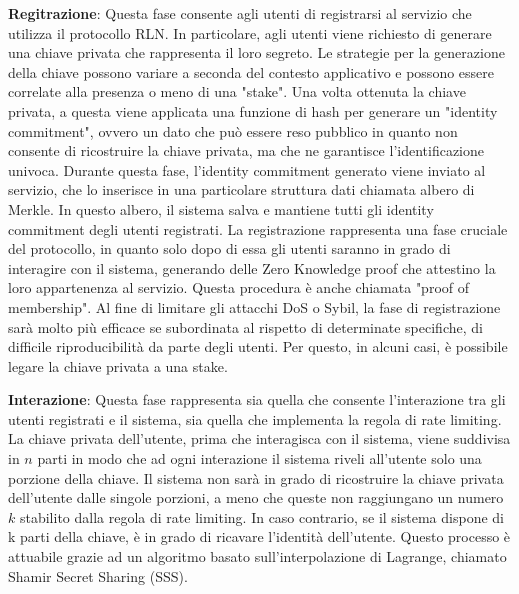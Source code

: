 \textbf{Regitrazione}: Questa fase consente agli utenti di registrarsi al servizio che utilizza il protocollo RLN. In
particolare, agli utenti viene richiesto di generare una chiave privata che rappresenta il loro segreto. Le strategie
per la generazione della chiave possono variare a seconda del contesto applicativo e possono essere correlate alla
presenza o meno di una "stake". Una volta ottenuta la chiave privata, a questa viene applicata una funzione di hash per
generare un "identity commitment", ovvero un dato che può essere reso pubblico in quanto non consente di ricostruire la
chiave privata, ma che ne garantisce l'identificazione univoca. Durante questa fase, l'identity commitment generato
viene inviato al servizio, che lo inserisce in una particolare struttura dati chiamata albero di Merkle. In questo
albero, il sistema salva e mantiene tutti gli identity commitment degli utenti registrati. La registrazione rappresenta
una fase cruciale del protocollo, in quanto solo dopo di essa gli utenti saranno in grado di interagire con il sistema,
generando delle Zero Knowledge proof che attestino la loro appartenenza al servizio. Questa procedura è anche chiamata "proof
of membership". Al fine di limitare gli attacchi DoS o Sybil, la fase di registrazione sarà molto più efficace se
subordinata al rispetto di determinate specifiche, di difficile riproducibilità da parte degli utenti. Per questo, in
alcuni casi, è possibile legare la chiave privata a una stake.

\textbf{Interazione}: Questa fase rappresenta sia quella che consente l'interazione tra gli utenti registrati e il sistema, sia quella che implementa la regola di rate limiting. La chiave privata dell'utente, prima che interagisca con il sistema, viene suddivisa in $n$ parti in modo che ad ogni interazione il sistema riveli all'utente solo una porzione della chiave. Il sistema non sarà in grado di ricostruire la chiave privata dell'utente dalle singole porzioni, a meno che queste non raggiungano un numero $k$ stabilito dalla regola di rate limiting. In caso contrario, se il sistema dispone di k parti della chiave, è in grado di ricavare l'identità dell'utente. Questo processo è attuabile grazie ad un algoritmo basato sull'interpolazione di Lagrange, chiamato Shamir Secret Sharing (SSS).



